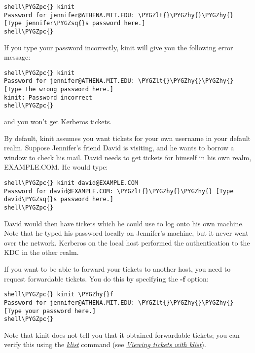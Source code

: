 \documentclass[letterpaper,10pt,english]{sphinxmanual}
\def\PYGZlt{\char`\<}
\def\PYGZpc{\char`\%}
\def\PYGZhy{\char`\-}
\def\PYGZsq{\char`\'}
\begin{document}
\begin{Verbatim}[commandchars=\\\{\}]
shell\PYGZpc{} kinit
Password for jennifer@ATHENA.MIT.EDU: \PYGZlt{}\PYGZhy{}\PYGZhy{} [Type jennifer\PYGZsq{}s password here.]
shell\PYGZpc{}
\end{Verbatim}

If you type your password incorrectly, kinit will give you the
following error message:

\begin{Verbatim}[commandchars=\\\{\}]
shell\PYGZpc{} kinit
Password for jennifer@ATHENA.MIT.EDU: \PYGZlt{}\PYGZhy{}\PYGZhy{} [Type the wrong password here.]
kinit: Password incorrect
shell\PYGZpc{}
\end{Verbatim}

and you won't get Kerberos tickets.

By default, kinit assumes you want tickets for your own username in
your default realm.  Suppose Jennifer's friend David is visiting, and
he wants to borrow a window to check his mail.  David needs to get
tickets for himself in his own realm, EXAMPLE.COM.  He would type:

\begin{Verbatim}[commandchars=\\\{\}]
shell\PYGZpc{} kinit david@EXAMPLE.COM
Password for david@EXAMPLE.COM: \PYGZlt{}\PYGZhy{}\PYGZhy{} [Type david\PYGZsq{}s password here.]
shell\PYGZpc{}
\end{Verbatim}

David would then have tickets which he could use to log onto his own
machine.  Note that he typed his password locally on Jennifer's
machine, but it never went over the network.  Kerberos on the local
host performed the authentication to the KDC in the other realm.

If you want to be able to forward your tickets to another host, you
need to request forwardable tickets.  You do this by specifying the
\textbf{-f} option:

\begin{Verbatim}[commandchars=\\\{\}]
shell\PYGZpc{} kinit \PYGZhy{}f
Password for jennifer@ATHENA.MIT.EDU: \PYGZlt{}\PYGZhy{}\PYGZhy{} [Type your password here.]
shell\PYGZpc{}
\end{Verbatim}

Note that kinit does not tell you that it obtained forwardable
tickets; you can verify this using the {\hyperref[user/user_commands/klist:klist-1]{\emph{klist}}} command (see
{\hyperref[user/tkt_mgmt:view-tkt]{\emph{Viewing tickets with klist}}}).
\end{document}
